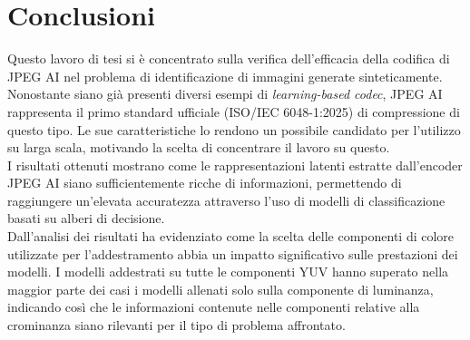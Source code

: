 \chapter{Conclusioni}\label{ch:conclusioni}
Questo lavoro di tesi si è concentrato sulla verifica dell'efficacia della codifica di JPEG AI nel problema di identificazione di immagini generate sinteticamente. Nonostante siano già presenti diversi esempi di \textit{learning-based codec}, JPEG AI rappresenta il primo standard ufficiale (ISO/IEC 6048-1:2025) di compressione di questo tipo. Le sue caratteristiche lo rendono un possibile candidato per l'utilizzo su larga scala, motivando la scelta di concentrare il lavoro su questo.\\
I risultati ottenuti mostrano come le rappresentazioni latenti estratte dall'encoder JPEG AI siano sufficientemente ricche di informazioni, permettendo di raggiungere un'elevata accuratezza attraverso l'uso di modelli di classificazione basati su alberi di decisione.\\
Dall'analisi dei risultati ha evidenziato come la scelta delle componenti di colore utilizzate per l'addestramento abbia un impatto significativo sulle prestazioni dei modelli. I modelli addestrati su tutte le componenti YUV hanno superato nella maggior parte dei casi i modelli allenati solo sulla componente di luminanza, indicando così che le informazioni contenute nelle componenti relative alla crominanza siano rilevanti per il tipo di problema affrontato.
